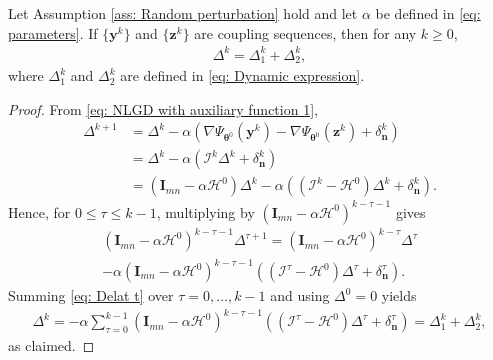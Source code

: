 \documentclass{siamart251216}
\begin{document}
\begin{lemma}
    \label{lem: Dynamic}
    Let Assumption \ref{ass: Random perturbation} hold and let $\alpha$ be defined in \eqref{eq: parameters}. If $\{\mathbf{y}^{k}\}$ and $\{\mathbf{z}^{k}\}$ are coupling sequences, then for any $k\geq0$,
    \begin{gather*}
        \Delta^{k}=\Delta_{1}^{k}+\Delta_{2}^{k},
    \end{gather*}
    where $\Delta_{1}^{k}$ and $\Delta_{2}^{k}$ are defined in \eqref{eq: Dynamic expression}.
\end{lemma}

\begin{proof}
    From \eqref{eq: NLGD with auxiliary function 1},
    \begin{align*}
        \Delta^{k+1}
        &=\Delta^{k}-\alpha\left(\nabla\Psi_{\boldsymbol{\theta}^{0}}(\mathbf{y}^{k})-\nabla\Psi_{\boldsymbol{\theta}^{0}}(\mathbf{z}^{k})+\delta_{\mathbf{n}}^{k}\right)\\
        &=\Delta^{k}-\alpha\left(\mathcal{I}^{k}\Delta^{k}+\delta_{\mathbf{n}}^{k}\right)\\
        &=(\mathbf{I}_{mn}-\alpha\mathcal{H}^{0})\Delta^{k}-\alpha\left((\mathcal{I}^{k}-\mathcal{H}^{0})\Delta^{k}+\delta_{\mathbf{n}}^{k}\right).
    \end{align*}
    Hence, for $0\leq\tau\leq k-1$, multiplying by $(\mathbf{I}_{mn}-\alpha\mathcal{H}^{0})^{k-\tau-1}$ gives
    \begin{multline}
        \label{eq: Delat t}
        (\mathbf{I}_{mn}-\alpha\mathcal{H}^{0})^{k-\tau-1}\Delta^{\tau+1}
        =(\mathbf{I}_{mn}-\alpha\mathcal{H}^{0})^{k-\tau}\Delta^{\tau}\\
        -\alpha(\mathbf{I}_{mn}-\alpha\mathcal{H}^{0})^{k-\tau-1}
        \left((\mathcal{I}^{\tau}-\mathcal{H}^{0})\Delta^{\tau}+\delta_{\mathbf{n}}^{\tau}\right).
    \end{multline}
    Summing \eqref{eq: Delat t} over $\tau=0,\ldots,k-1$ and using $\Delta^{0}=0$ yields
    \begin{gather*}
        \Delta^{k}=-\alpha\sum_{\tau=0}^{k-1}(\mathbf{I}_{mn}-\alpha\mathcal{H}^{0})^{k-\tau-1}
        \left((\mathcal{I}^{\tau}-\mathcal{H}^{0})\Delta^{\tau}+\delta_{\mathbf{n}}^{\tau}\right)
        =\Delta_{1}^{k}+\Delta_{2}^{k},
    \end{gather*}
    as claimed.
\end{proof}
\end{document}
